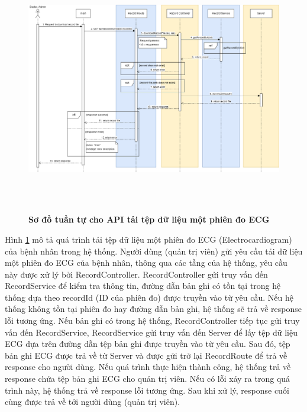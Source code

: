  \begin{figure}[H]
  \centering
  \includegraphics[width=16cm,height=11cm]{Images/sequence_api/downloadRecordDataById.png}
  \caption[Sơ đồ tuần tự cho API tải tệp dữ liệu một phiên đo ECG ]{\bfseries \fontsize{12pt}{0pt}
  \selectfont Sơ đồ tuần tự cho API tải tệp dữ liệu một phiên đo ECG }
  \label{downloadRecordDataById} %
\end{figure}
Hình \ref{downloadRecordDataById} mô tả quá trình tải tệp dữ liệu một phiên đo ECG (Electrocardiogram) của bệnh nhân trong hệ thống. Người dùng (quản trị viên) gửi yêu cầu tải dữ liệu một phiên đo ECG của bệnh nhân, thông qua các tầng của hệ thống, 
yêu cầu này được xử lý bởi RecordController. RecordController gửi truy vấn đến RecordService để kiểm tra thông tin, đường dẫn bản ghi có tồn tại trong hệ thống dựa theo recordId (ID của phiên đo) được truyền vào từ yêu cầu. Nếu hệ thống không tồn tại phiên đo hay đường dẫn bản ghi, hệ thống sẽ
trả về response lỗi tương ứng. Nếu bản ghi có trong hệ thống, RecordController tiếp tục gửi truy vấn đến RecordService, RecordService gửi truy vấn đến Server để lấy tệp dữ liệu ECG dựa trên đường dẫn tệp bản ghi được truyền vào từ yêu cầu. 
Sau đó, tệp bản ghi ECG được trả về từ Server và được gửi trở lại RecordRoute để trả về response cho người dùng. Nếu quá trình thực hiện thành công, hệ thống trả về response chứa tệp bản ghi ECG cho quản trị viên. Nếu có lỗi xảy ra
 trong quá trình này, hệ thống trả về response lỗi tương ứng. Sau khi xử lý, response cuối cùng được trả về tới người dùng (quản trị viên).

